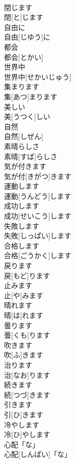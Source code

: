 \documentclass[8pt]{extreport}
\begin{document}
\begin{CJK}{UTF8}{min}
\\	閉じます	
\\	閉[と]じます	
\\	自由に	
\\	自由[じゆう]に	
\\	都会	
\\	都会[とかい]	
\\	世界中	
\\	世界中[せかいじゅう]	
\\	集まります	
\\	集[あつ]まります	
\\	美しい	
\\	美[うつく]しい	
\\	自然	
\\	自然[しぜん]	
\\	素晴らしさ	
\\	素晴[すば]らしさ	
\\	気が付きます	
\\	気が付[きがつ]きます	
\\	運動します	
\\	運動[うんどう]します	
\\	成功します	
\\	成功[せいこう]します	
\\	失敗します	
\\	失敗[しっぱい]します	
\\	合格します	
\\	合格[ごうかく]します	
\\	戻ります	
\\	戻[もど]ります	
\\	止みます	
\\	止[や]みます	
\\	晴れます	
\\	晴[は]れます	
\\	曇ります	
\\	曇[くも]ります	
\\	吹きます	
\\	吹[ふ]きます	
\\	治ります	
\\	治[なお]ります	
\\	続きます	
\\	続[つづ]きます	
\\	引きます	
\\	引[ひ]きます	
\\	冷やします	
\\	冷[ひ]やします	
\\	心配「な」	
\\	心配[しんぱい]「な」	

\end{CJK}
\end{document}

